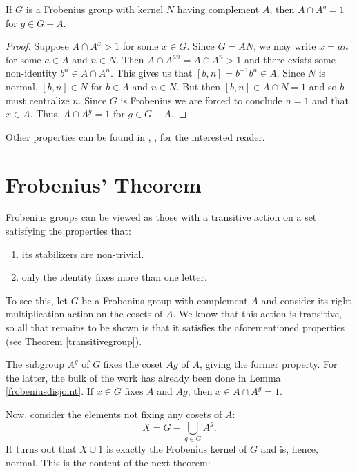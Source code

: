 \documentclass[main.tex]{subfiles}
\begin{document}
\begin{lemma}\label{frobeniusdisjoint}
If $G$ is a Frobenius group with kernel $N$ having complement $A$, then $A \cap A^g = 1$ for $g \in G - A$.
\end{lemma}

\begin{proof}
Suppose $A \cap A^x > 1$ for some $x \in G$. Since $G = AN$, we may write $x = an$ for some $a \in A$ and $n \in N$. Then $A \cap A^{an} = A \cap A^n > 1$ and there exists some non-identity $b^n \in A \cap A^n$. This gives us that $[b,n] = b^{-1}b^n \in A$. Since $N$ is normal, $[b, n] \in N$ for $b \in A$ and $n \in N$. But then $[b,n] \in A \cap N = 1$ and so $b$ must centralize $n$. Since $G$ is Frobenius we are forced to conclude $n = 1$ and that $x \in A$. Thus, $A \cap A^g = 1$ for $g \in G - A$.
\end{proof}

Other properties can be found in \cite{isaacsfinitegrouptheory}, \cite{gorensteinfinitegroups}, \cite{isaacsalgebra} for the interested reader.

\hss

\section{Frobenius' Theorem}

\hss

Frobenius groups can be viewed as those with a transitive action on a set satisfying the properties that:
\begin{enumerate}
	\item its stabilizers are non-trivial.
	\item only the identity fixes more than one letter.
\end{enumerate}
To see this, let $G$ be a Frobenius group with complement $A$ and consider its right multiplication action on the cosets of $A$. We know that this action is transitive, so all that remains to be shown is that it satisfies the aforementioned properties (see Theorem \ref{transitivegroup}).

The subgroup $A^g$ of $G$ fixes the coset $Ag$ of $A$, giving the former property. For the latter, the bulk of the work has already been done in Lemma \ref{frobeniusdisjoint}. If $x \in G$ fixes $A$ and $Ag$, then $x \in A \cap A^g = 1$.

Now, consider the elements not fixing any cosets of $A$:
$$X = G - \bigcup_{g \in G} A^g\text{.}$$
It turns out that $X \cup {1}$ is exactly the Frobenius kernel of $G$ and is, hence, normal. This is the content of the next theorem:
\end{document}
